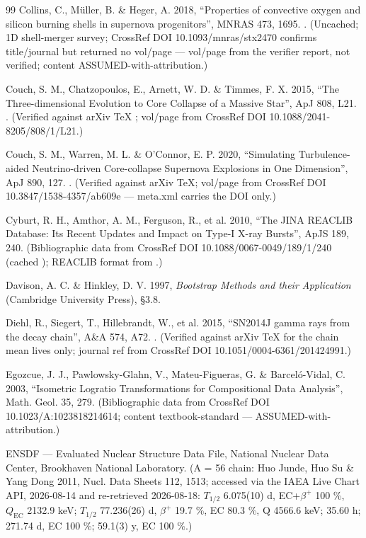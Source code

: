 \begin{thebibliography}{99}
Collins, C., M\"uller, B. \& Heger, A. 2018, ``Properties of convective oxygen and silicon burning shells in supernova progenitors'', MNRAS 473, 1695. . (Uncached; 1D shell-merger survey; CrossRef DOI 10.1093/mnras/stx2470 confirms title/journal but returned no vol/page --- vol/page from the verifier report, not verified; content ASSUMED-with-attribution.)

Couch, S. M., Chatzopoulos, E., Arnett, W. D. \& Timmes, F. X. 2015, ``The Three-dimensional Evolution to Core Collapse of a Massive Star'', ApJ 808, L21. . (Verified against arXiv TeX ; vol/page from CrossRef DOI 10.1088/2041-8205/808/1/L21.)

Couch, S. M., Warren, M. L. \& O'Connor, E. P. 2020, ``Simulating Turbulence-aided Neutrino-driven Core-collapse Supernova Explosions in One Dimension'', ApJ 890, 127. . (Verified against arXiv TeX; vol/page from CrossRef DOI 10.3847/1538-4357/ab609e --- meta.xml carries the DOI only.)

Cyburt, R. H., Amthor, A. M., Ferguson, R., et al. 2010, ``The JINA REACLIB Database: Its Recent Updates and Impact on Type-I X-ray Bursts'', ApJS 189, 240. (Bibliographic data from CrossRef DOI 10.1088/0067-0049/189/1/240 (cached ); REACLIB format from .)

Davison, A. C. \& Hinkley, D. V. 1997, \emph{Bootstrap Methods and their Application} (Cambridge University Press), \S 3.8.

Diehl, R., Siegert, T., Hillebrandt, W., et al. 2015, ``SN2014J gamma rays from the  decay chain'', A\&A 574, A72. . (Verified against arXiv TeX  for the chain mean lives only; journal ref from CrossRef DOI 10.1051/0004-6361/201424991.)

Egozcue, J. J., Pawlowsky-Glahn, V., Mateu-Figueras, G. \& Barcel\'o-Vidal, C. 2003, ``Isometric Logratio Transformations for Compositional Data Analysis'', Math. Geol. 35, 279. (Bibliographic data from CrossRef DOI 10.1023/A:1023818214614; content textbook-standard --- ASSUMED-with-attribution.)

ENSDF --- Evaluated Nuclear Structure Data File, National Nuclear Data Center, Brookhaven National Laboratory. (A = 56 chain: Huo Junde, Huo Su \& Yang Dong 2011, Nucl. Data Sheets 112, 1513; accessed via the IAEA Live Chart API, 2026-08-14 and re-retrieved 2026-08-18:  $T_{1/2}$ 6.075(10) d, EC+$\beta^+$ 100 \%, $Q_{\mathrm{EC}}$ 2132.9 keV;  $T_{1/2}$ 77.236(26) d, $\beta^+$ 19.7 \%, EC 80.3 \%, Q 4566.6 keV;  35.60 h;  271.74 d, EC 100 \%;  59.1(3) y, EC 100 \%.)


\end{thebibliography}
